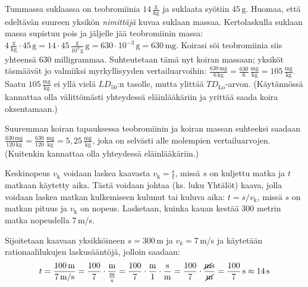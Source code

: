 \begin{esimerkki}
\begin{esimratk}
	Tummassa suklaassa on teobromiinia $14\,\frac{\text{g}}{\text{kg}}$ ja suklaata syötiin $45\,\text{g}$. Huomaa, että edeltävän suureen yksikön \textit{nimittäjä} kuvaa suklaan massaa. Kertolaskulla suklaan massa supistuu pois ja jäljelle jää teobromiinin massa: $4\,\frac{\text{g}}{\text{kg}}\cdot 45\,\text{g}= 14\cdot 45\,\frac{\text{g}}{10^3\,\text{g}}\,\text{g}= 630\cdot10^{-3}\,\text{g}= 630\,\text{mg}$.
	Koirasi söi teobromiinia siis yhteensä $630$ milligrammaa. Suhteutetaan tämä nyt koiran massaan; yksiköt täsmäävät jo valmiiksi myrkyllisyyden vertailuarvoihin: $\frac{630\,\text{mg}}{6\,\text{kg}}=\frac{630}{6}\,\frac{\text{mg}}{\text{kg}}=105\,\frac{\text{mg}}{\text{kg}}$. Saatu $105\,\frac{\text{mg}}{\text{kg}}$ ei yllä vielä $LD_{50}$:n tasolle, mutta ylittää $T\!D_\text{Lo}$-arvon. (Käytännössä kannattaa olla välittömästi yhteydessä eläinlääkäriin ja yrittää saada koira oksentamaan.)
	
	Suuremman koiran tapauksessa teobromiinin ja koiran massan suhteeksi saadaan $\frac{630\,\text{mg}}{120\,\text{kg}}=\frac{630}{120}\,\frac{\text{mg}}{\text{kg}}=5,25\,\frac{\text{mg}}{\text{kg}}$, joka on selvästi alle molempien vertailuarvojen. (Kuitenkin kannattaa olla yhteydessä eläinlääkäriin.)
	\end{esimratk}
\end{esimerkki}


\begin{esimerkki}
Keskinopeus $v_\mathrm{k}$ voidaan laskea kaavasta $v_\mathrm{k}=\frac{\text{s}}{\text{t}}$, missä $s$ on kuljettu matka ja $t$ matkaan käytetty aika. Tästä voidaan johtaa (ks. luku Yhtälöt) kaava, jolla voidaan laskea matkan kulkemiseen kulunut tai kuluva aika: $t=s/v_\mathrm{k}$, missä $s$ on matkan pituus ja $v_\mathrm{k}$ on nopeus. Lasketaan, kuinka kauan kestää $300$ metrin matka nopeudella $7$\,m/s.

Sijoitetaan kaavaan yksikköineen $s=300$\,m ja $v_k= 7$\,m/s ja käytetään rationaalilukujen laskusääntöjä, jolloin saadaan:
\[t=\frac{100\,\textrm{m}}{7\,\textrm{m/s}} = \frac{100}{7} \cdot \frac{\textrm{m}}{\frac{\textrm{m}}{\textrm{s}}} 
= \frac{100}{7} \cdot \frac{\textrm{m}}{1} \cdot \frac{\textrm{s}}{\textrm{m}}
= \frac{100}{7} \cdot \frac{\cancel{\textrm{m}}\textrm{s}}{\cancel{\textrm{m}}}
=\frac{100}{7}\,\textrm{s} \approx 14\,\textrm{s}\]
\end{esimerkki}

